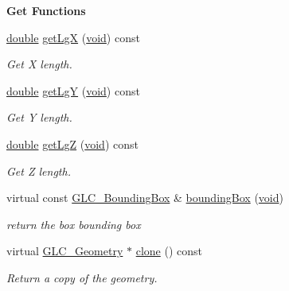 \begin{Indent}{\bf Get Functions}\par
\begin{DoxyCompactItemize}
\item 
\hyperlink{_super_l_u_support_8h_a8956b2b9f49bf918deed98379d159ca7}{double} \hyperlink{class_g_l_c___box_abd5a7ac44487708c6c18d7b92e51af5b}{get\-Lg\-X} (\hyperlink{group___u_a_v_objects_plugin_ga444cf2ff3f0ecbe028adce838d373f5c}{void}) const 
\begin{DoxyCompactList}\small\item\em Get X length. \end{DoxyCompactList}\item 
\hyperlink{_super_l_u_support_8h_a8956b2b9f49bf918deed98379d159ca7}{double} \hyperlink{class_g_l_c___box_ad90ee0f27aa9ab6e9b1c47c78e698da5}{get\-Lg\-Y} (\hyperlink{group___u_a_v_objects_plugin_ga444cf2ff3f0ecbe028adce838d373f5c}{void}) const 
\begin{DoxyCompactList}\small\item\em Get Y length. \end{DoxyCompactList}\item 
\hyperlink{_super_l_u_support_8h_a8956b2b9f49bf918deed98379d159ca7}{double} \hyperlink{class_g_l_c___box_a00b1aad64ea792dcb6790cb21eb0d1a2}{get\-Lg\-Z} (\hyperlink{group___u_a_v_objects_plugin_ga444cf2ff3f0ecbe028adce838d373f5c}{void}) const 
\begin{DoxyCompactList}\small\item\em Get Z length. \end{DoxyCompactList}\item 
virtual const \hyperlink{class_g_l_c___bounding_box}{G\-L\-C\-\_\-\-Bounding\-Box} \& \hyperlink{class_g_l_c___box_a47f911e50dfbdb99278fa1730be6a1a1}{bounding\-Box} (\hyperlink{group___u_a_v_objects_plugin_ga444cf2ff3f0ecbe028adce838d373f5c}{void})
\begin{DoxyCompactList}\small\item\em return the box bounding box \end{DoxyCompactList}\item 
virtual \hyperlink{class_g_l_c___geometry}{G\-L\-C\-\_\-\-Geometry} $\ast$ \hyperlink{class_g_l_c___box_af2342ed86927364d7e59bf098e670ee9}{clone} () const 
\begin{DoxyCompactList}\small\item\em Return a copy of the geometry. \end{DoxyCompactList}\end{DoxyCompactItemize}
\end{Indent}
